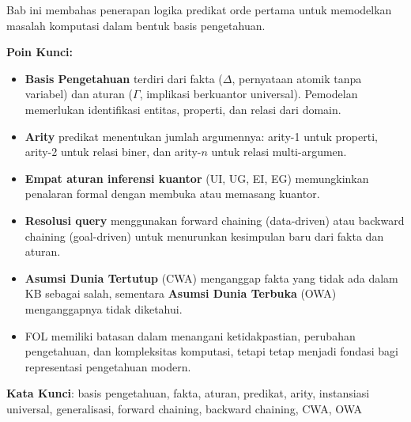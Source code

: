 \documentclass[../main]{subfiles}
\begin{document}

\begin{rangkuman}
Bab ini membahas penerapan logika predikat orde pertama untuk memodelkan masalah komputasi dalam bentuk basis pengetahuan.

\textbf{Poin Kunci:}
\begin{itemize}
  \item \textbf{Basis Pengetahuan} terdiri dari fakta ($\Delta$, pernyataan atomik tanpa variabel) dan aturan ($\Gamma$, implikasi berkuantor universal). Pemodelan memerlukan identifikasi entitas, properti, dan relasi dari domain.
  \item \textbf{Arity} predikat menentukan jumlah argumennya: arity-1 untuk properti, arity-2 untuk relasi biner, dan arity-$n$ untuk relasi multi-argumen.
  \item \textbf{Empat aturan inferensi kuantor} (UI, UG, EI, EG) memungkinkan penalaran formal dengan membuka atau memasang kuantor.
  \item \textbf{Resolusi query} menggunakan forward chaining (data-driven) atau backward chaining (goal-driven) untuk menurunkan kesimpulan baru dari fakta dan aturan.
  \item \textbf{Asumsi Dunia Tertutup} (CWA) menganggap fakta yang tidak ada dalam KB sebagai salah, sementara \textbf{Asumsi Dunia Terbuka} (OWA) menganggapnya tidak diketahui.
  \item FOL memiliki batasan dalam menangani ketidakpastian, perubahan pengetahuan, dan kompleksitas komputasi, tetapi tetap menjadi fondasi bagi representasi pengetahuan modern.
\end{itemize}

\textbf{Kata Kunci}: basis pengetahuan, fakta, aturan, predikat, arity, instansiasi universal, generalisasi, forward chaining, backward chaining, CWA, OWA
\end{rangkuman}

\ifSubfilesClassLoaded{
  \renewcommand{\bibname}{Daftar Pustaka}
  
  
}{}
\end{document}
